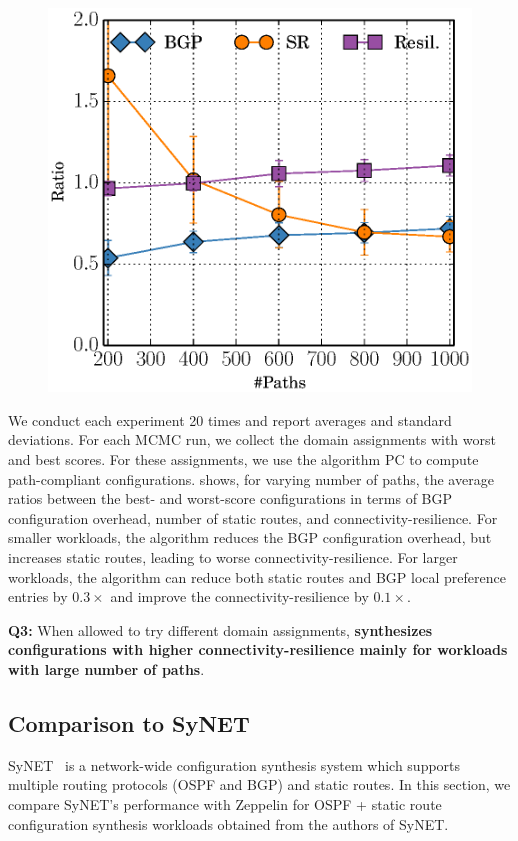 \begin{figure}
\vspace{-5.5mm}
	\includegraphics[width=0.48\columnwidth]{figures/ratioMCMC.eps}
	\vspace{-3mm}
\end{figure}
We conduct each experiment 20 times and report averages and standard
deviations.  For each MCMC run, we collect the domain assignments with
worst and best scores.  For these assignments, we use the algorithm PC
to compute path-compliant configurations.
 shows, for varying number of paths, the average ratios
between the best- and worst-score configurations
in terms of
BGP configuration overhead, 
number of static routes, and 
connectivity-resilience.
For smaller workloads, 
the algorithm reduces the BGP configuration overhead, but increases 
static routes, leading to worse connectivity-resilience. For 
larger workloads, the algorithm can
reduce both static routes 
and BGP local preference entries by $0.3\times$
and improve the connectivity-resilience 
by $0.1\times$.

\textbf{Q3:}
When allowed to try different domain assignments,
\textbf{\name synthesizes configurations with higher connectivity-resilience mainly for workloads with large number of paths}.

\subsection{Comparison to SyNET}
\label{sec:synet}
SyNET~\cite{synet} is a network-wide configuration synthesis system 
which supports multiple routing protocols (OSPF and BGP) and static 
routes. In this section, we compare SyNET's performance with Zeppelin 
for OSPF + static route configuration synthesis workloads obtained from the 
authors of SyNET.

